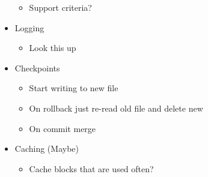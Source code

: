 \documentclass{article}
\begin{document}
\begin{itemize}
\begin{itemize}
            \item    Support criteria?
        \end{itemize}
    \item   Logging
        \begin{itemize}
            \item   Look this up
        \end{itemize}
    \item   Checkpoints
        \begin{itemize}
            \item    Start writing to new file
            \item    On rollback just re-read old file and delete new
            \item    On commit merge
        \end{itemize}
    \item    Caching (Maybe)
        \begin{itemize}
            \item    Cache blocks that are used often?
        \end{itemize}

\end{itemize}
\end{document}
